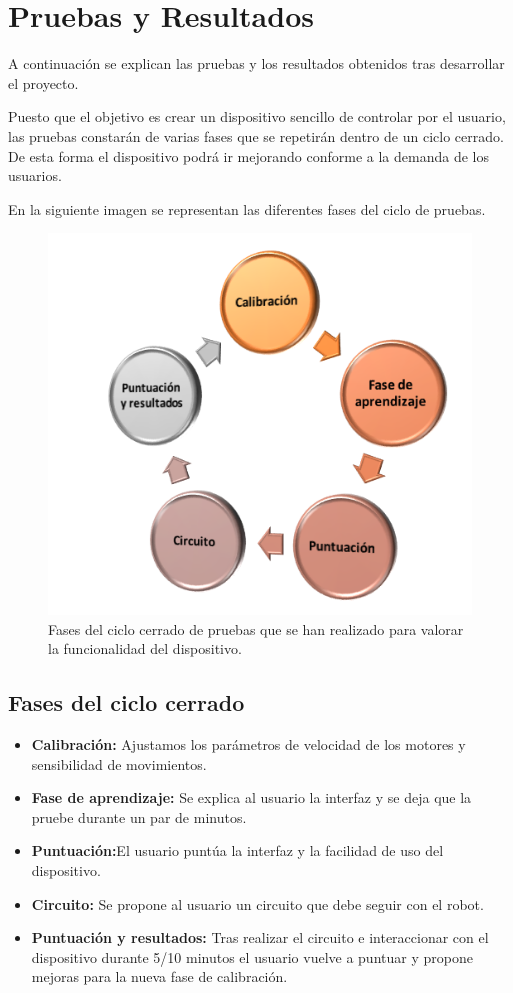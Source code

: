 \documentclass[twoside, 12pt]{epstfg}
\begin{document}
\chapter{Pruebas y Resultados}

A continuación se explican las pruebas y los resultados obtenidos tras desarrollar el proyecto.

Puesto que el objetivo es crear un dispositivo sencillo de controlar por el usuario, las pruebas constarán de varias fases que se repetirán dentro de un ciclo cerrado. De esta forma el dispositivo podrá ir mejorando conforme a la demanda de los usuarios.

En la siguiente imagen se representan las diferentes fases del ciclo de pruebas.

\begin{figure}[h!]
	\centerline{
		\mbox{\includegraphics[width=.60\textwidth]{images/CicloPruebas.png}}
	}
	\caption{Fases del ciclo cerrado de pruebas que se han realizado para valorar la funcionalidad del dispositivo.}
\end{figure}

\section{Fases del ciclo cerrado}
\begin{itemize}
	\item \textbf{Calibración:} Ajustamos los parámetros de velocidad de los motores y sensibilidad de movimientos.
	\item \textbf{Fase de aprendizaje:} Se explica al usuario la interfaz y se deja que la pruebe durante un par de minutos.
	\item \textbf{Puntuación:}El usuario puntúa la interfaz y la facilidad de uso del dispositivo.
	\item \textbf{Circuito:} Se propone al usuario un circuito que debe seguir con el robot.
	\item \textbf{Puntuación y resultados:} Tras realizar el circuito e interaccionar con el dispositivo durante 5/10 minutos el usuario vuelve a puntuar y propone mejoras para la nueva fase de calibración.
\end{itemize}
\end{document}
